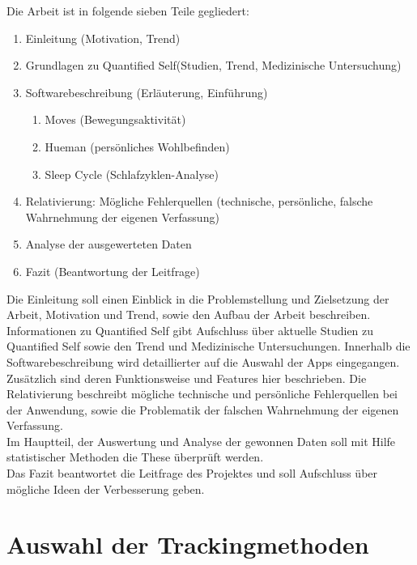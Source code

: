 Die Arbeit ist in folgende sieben Teile gegliedert:


\begin{enumerate}
\def\labelenumi{\arabic{enumi}.}
\itemsep1pt\parskip0pt
\item
  Einleitung (Motivation, Trend)
\item
  Grundlagen zu Quantified Self(Studien, Trend, Medizinische
  Untersuchung)
\item
  Softwarebeschreibung (Erläuterung, Einführung)

  \begin{enumerate}
  \def\labelenumii{\alph{enumii}.}
  \itemsep1pt\parskip0pt
  \item
    Moves (Bewegungsaktivität)
  \item
    Hueman (persönliches Wohlbefinden)
  \item
    Sleep Cycle (Schlafzyklen-Analyse)
  \end{enumerate}
\item
  Relativierung: Mögliche Fehlerquellen (technische, persönliche,
  falsche Wahrnehmung der eigenen Verfassung)
\item
  Analyse der ausgewerteten Daten
\item
  Fazit (Beantwortung der Leitfrage)
\end{enumerate}

Die Einleitung soll einen Einblick in die Problemstellung und Zielsetzung der Arbeit, Motivation und Trend, sowie den Aufbau der Arbeit beschreiben.
Informationen zu Quantified Self gibt Aufschluss über aktuelle Studien zu Quantified Self sowie den Trend und Medizinische Untersuchungen.
Innerhalb die Softwarebeschreibung wird detaillierter auf die Auswahl der Apps eingegangen.\\
Zusätzlich sind deren Funktionsweise und Features hier beschrieben.
Die Relativierung beschreibt mögliche technische und persönliche Fehlerquellen bei der Anwendung, sowie die Problematik der falschen Wahrnehmung der eigenen Verfassung.
\\
Im Hauptteil, der Auswertung und Analyse der gewonnen Daten soll mit Hilfe statistischer Methoden die These überprüft werden.
\\
Das Fazit beantwortet die Leitfrage des Projektes und soll Aufschluss über mögliche Ideen der Verbesserung geben.

\section{Auswahl der Trackingmethoden}
\label{ch:Einleitung:sec:AuswahlDerTrackingmethoden}

